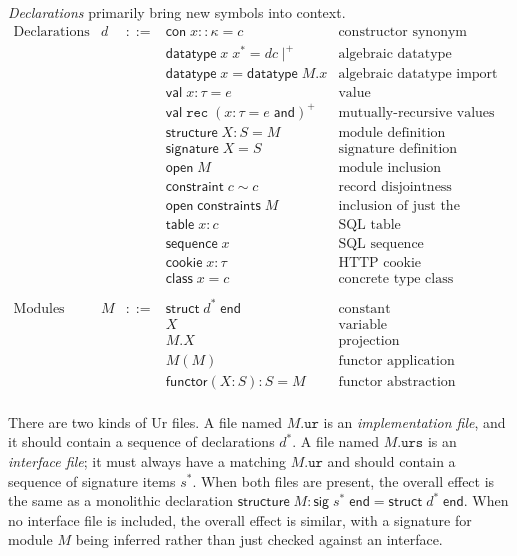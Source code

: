 \documentclass{article}
\newcommand{\cd}[1]{\texttt{#1}}
\newcommand{\mt}[1]{\mathsf{#1}}
\begin{document}
\emph{Declarations} primarily bring new symbols into context.
$$\begin{array}{rrcll}
  \textrm{Declarations} & d &::=& \mt{con} \; x :: \kappa = c & \textrm{constructor synonym} \\
  &&& \mt{datatype} \; x \; x^* = dc\mid^+ & \textrm{algebraic datatype definition} \\
  &&& \mt{datatype} \; x = \mt{datatype} \; M.x & \textrm{algebraic datatype import} \\
  &&& \mt{val} \; x : \tau = e & \textrm{value} \\
  &&& \mt{val} \; \cd{rec} \; (x : \tau = e \; \mt{and})^+ & \textrm{mutually-recursive values} \\
  &&& \mt{structure} \; X : S = M & \textrm{module definition} \\
  &&& \mt{signature} \; X = S & \textrm{signature definition} \\
  &&& \mt{open} \; M & \textrm{module inclusion} \\
  &&& \mt{constraint} \; c \sim c & \textrm{record disjointness constraint} \\
  &&& \mt{open} \; \mt{constraints} \; M & \textrm{inclusion of just the constraints from a module} \\
  &&& \mt{table} \; x : c & \textrm{SQL table} \\
  &&& \mt{sequence} \; x & \textrm{SQL sequence} \\
  &&& \mt{cookie} \; x : \tau & \textrm{HTTP cookie} \\
  &&& \mt{class} \; x = c & \textrm{concrete type class} \\
  \\
  \textrm{Modules} & M &::=& \mt{struct} \; d^* \; \mt{end} & \textrm{constant} \\
  &&& X & \textrm{variable} \\
  &&& M.X & \textrm{projection} \\
  &&& M(M) & \textrm{functor application} \\
  &&& \mt{functor}(X : S) : S = M & \textrm{functor abstraction} \\
\end{array}$$

There are two kinds of Ur files.  A file named $M\texttt{.ur}$ is an \emph{implementation file}, and it should contain a sequence of declarations $d^*$.  A file named $M\texttt{.urs}$ is an \emph{interface file}; it must always have a matching $M\texttt{.ur}$ and should contain a sequence of signature items $s^*$.  When both files are present, the overall effect is the same as a monolithic declaration $\mt{structure} \; M : \mt{sig} \; s^* \; \mt{end} = \mt{struct} \; d^* \; \mt{end}$.  When no interface file is included, the overall effect is similar, with a signature for module $M$ being inferred rather than just checked against an interface.
\end{document}
